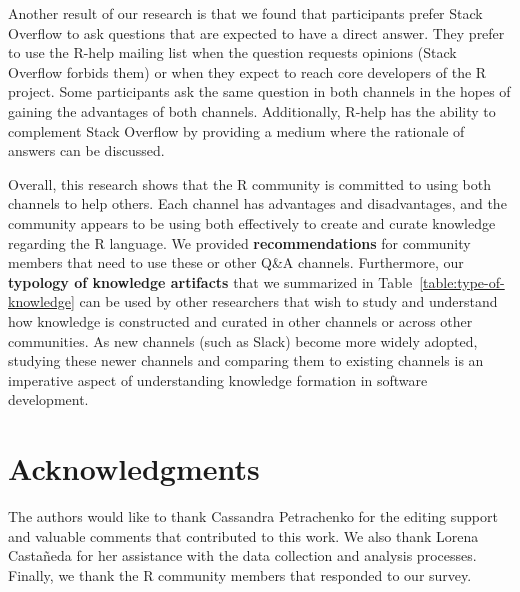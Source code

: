 \documentclass[smallextended]{svjour3}       %
\newcommand{\SO}{Stack Overflow\xspace}
\newcommand{\RH}{R-help\xspace}
\begin{document}
Another result of our research is that we found that participants prefer \SO to ask questions that are expected to have a direct answer. They prefer to use the \RH mailing list when the
question requests opinions (\SO forbids them) or when they expect to reach core developers of the R project. Some participants ask the same question in both
channels in the hopes of gaining the advantages of both channels. Additionally, \RH has the ability to complement \SO by providing a medium where the rationale
of answers can be discussed.

Overall, this research shows that the R community is committed to using both channels to help others. Each channel has advantages and disadvantages, and the
community appears to be using both effectively to create and curate knowledge regarding the R language.  We provided \textbf{recommendations} for community members that need to use these or other Q\&A channels.  Furthermore, our \textbf{typology of knowledge artifacts} that we summarized in Table~\ref{table:type-of-knowledge} can be used by other researchers that wish to study and understand how knowledge is constructed and curated in other channels or across other communities.  As new channels (such as Slack) become more widely adopted, studying these newer channels and comparing them to existing channels is an imperative aspect of understanding knowledge formation in software development. 












 
\section{Acknowledgments}
The authors would like to thank Cassandra Petrachenko for the editing support and valuable comments that contributed to this work. We also thank Lorena Castañeda for her assistance with the data collection and analysis processes.  Finally, we thank the R community members that responded to our survey.



\end{document}
